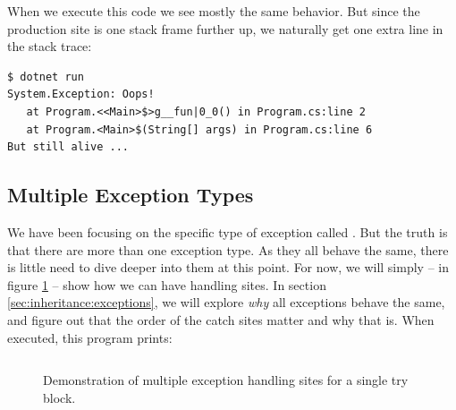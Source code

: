 \inputminted[firstline=1]{csharp}{../src/csharp/exceptions/catching_fun/Program.cs}

When we execute this code we see mostly the same behavior. But since the production site is one stack frame further up, we naturally get one extra line in the stack trace:

\begin{verbatim}
$ dotnet run
System.Exception: Oops!
   at Program.<<Main>$>g__fun|0_0() in Program.cs:line 2
   at Program.<Main>$(String[] args) in Program.cs:line 6
But still alive ...
\end{verbatim}

\subsection{Multiple Exception Types}

We have been focusing on the specific type of exception called . But the truth is that there are more than one exception type. As they all behave the same, there is little need to dive deeper into them at this point. For now, we will simply -- in figure \ref{fig:exceptions:multiple} -- show how we can have  handling sites. In section \ref{sec:inheritance:exceptions}, we will explore \textsl{why} all exceptions behave the same, and figure out that the order of the catch sites matter and why that is. When executed, this program prints:

\begin{figure}[tbp]
  \inputminted[firstline=1]{csharp}{../src/csharp/exceptions/multiple/Program.cs}
  \caption[Demo of multiple exception handling sites]{Demonstration of multiple exception handling sites for a single try block.}
  \label{fig:exceptions:multiple}
\end{figure}

